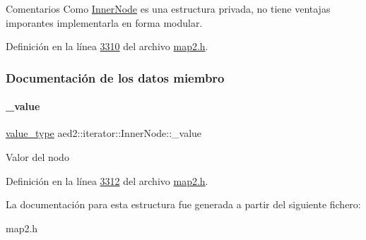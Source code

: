 \begin{DoxyRemark}{Comentarios}
Como \hyperlink{structaed2_1_1iterator_1_1InnerNode}{Inner\+Node} es una estructura privada, no tiene ventajas imporantes implementarla en forma modular. 
\end{DoxyRemark}


Definición en la línea \hyperlink{map2_8h_source_l03310}{3310} del archivo \hyperlink{map2_8h_source}{map2.\+h}.



\subsubsection{Documentación de los datos miembro}
\mbox{\label{structaed2_1_1iterator_1_1InnerNode_a3d80723a2dd1b746c0687f39fbc3d5e2_a3d80723a2dd1b746c0687f39fbc3d5e2}} 
\paragraph{\texorpdfstring{\+\_\+value}{\_value}}
{\footnotesize\ttfamily \hyperlink{classaed2_1_1iterator_a6411a2c08b2b7c52f063bef1a168acb6_a6411a2c08b2b7c52f063bef1a168acb6}{value\+\_\+type} aed2\+::iterator\+::\+Inner\+Node\+::\+\_\+value}

Valor del nodo 

Definición en la línea \hyperlink{map2_8h_source_l03312}{3312} del archivo \hyperlink{map2_8h_source}{map2.\+h}.



La documentación para esta estructura fue generada a partir del siguiente fichero\+:\begin{DoxyCompactItemize}
\item 
map2.\+h\end{DoxyCompactItemize}
